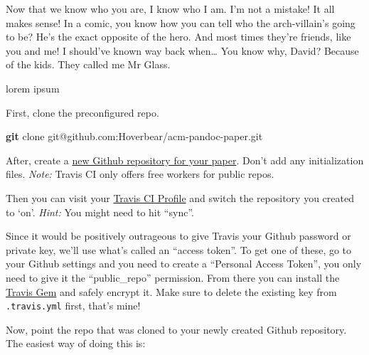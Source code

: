 \documentclass[]{templates/sig-alternate-2}
\newenvironment{Shaded}{}{}
\newcommand{\KeywordTok}[1]{\textcolor[rgb]{0.00,0.44,0.13}{\textbf{{#1}}}}
\newcommand{\OtherTok}[1]{\textcolor[rgb]{0.00,0.44,0.13}{{#1}}}
\newcommand{\NormalTok}[1]{{#1}}
\begin{document}
Now that we know who you are, I know who I am. I'm not a mistake! It all makes sense! In a comic, you know how you can tell who the arch-villain's going to be? He's the exact opposite of the hero. And most times they're friends, like you and me! I should've known way back when\ldots{} You know why, David? Because of the kids. They called me Mr Glass.

lorem ipsum

First, clone the preconfigured repo.

\begin{Shaded}
\begin{Highlighting}[]
\KeywordTok{git} \NormalTok{clone git@github.com:Hoverbear/acm-pandoc-paper.git}
\end{Highlighting}
\end{Shaded}

After, create a \href{https://github.com/new}{new Github repository for your paper}. Don't add any initialization files. \emph{Note:} Travis CI only offers free workers for public repos.

Then you can visit your \href{https://travis-ci.org/profile}{Travis CI Profile} and switch the repository you created to `on'. \emph{Hint:} You might need to hit ``sync''.

Since it would be positively outrageous to give Travis your Github password or private key, we'll use what's called an ``access token''. To get one of these, go to your Github settings and you need to create a ``Personal Access Token'', you only need to give it the ``public\_repo'' permission. From there you can install the \href{https://github.com/travis-ci/travis.rb\#installation}{Travis Gem} and safely encrypt it. Make sure to delete the existing key from \texttt{.travis.yml} first, that's mine!

\begin{Shaded}
\end{Shaded}

Now, point the repo that was cloned to your newly created Github repository. The easiest way of doing this is:

\begin{Shaded}
\end{Shaded}
\end{document}
